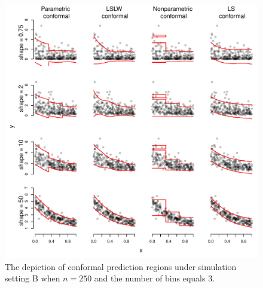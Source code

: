 \documentclass[11pt]{article}\usepackage[]{graphicx}\usepackage[]{color}
\makeatletter
\def\maxwidth{ %
  \ifdim\Gin@nat@width>\linewidth
    \linewidth
  \else
    \Gin@nat@width
  \fi
}
\newenvironment{knitrout}{}{} %
\makeatother
\begin{document}
\newpage
\begin{figure}[h!]
\begin{center}
\begin{knitrout}
\color{fgcolor}
\includegraphics[width=\maxwidth]{figure/conformal-plots-B-250-1} 

\end{knitrout}
\end{center}
\caption{The depiction of conformal prediction regions under simulation 
  setting B when $n = 250$ and the number of bins equals 3.
}
\label{conformal-plots-B-250}
\end{figure}
\end{document}
